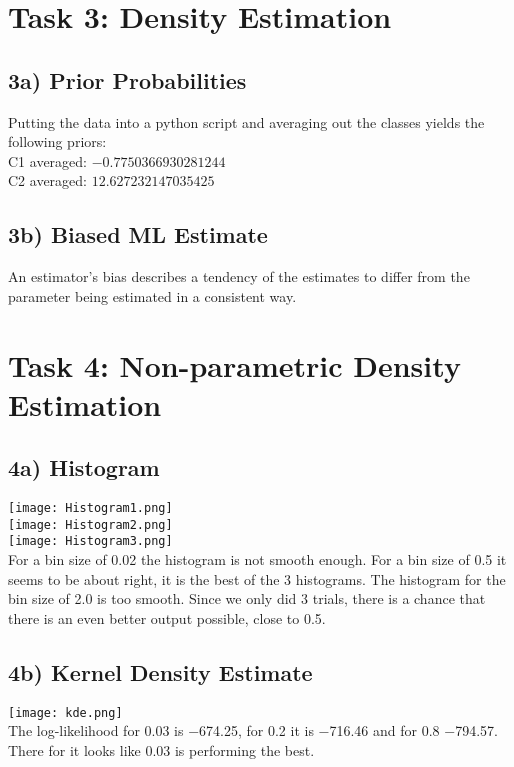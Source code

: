\documentclass{article}
\begin{document}
\section{Task 3: Density Estimation}
\subsection{3a) Prior Probabilities}
Putting the data into a python script and averaging out the classes yields the following priors: \\
C1 averaged: $-0.7750366930281244$ \\
C2 averaged: $12.627232147035425$

\subsection{3b) Biased ML Estimate}
An estimator's bias describes a tendency of the estimates to differ from the parameter being estimated in a consistent way.

\section{Task 4: Non-parametric Density Estimation}
\subsection{4a) Histogram}

\texttt{[image: Histogram1.png]}\\
\texttt{[image: Histogram2.png]}\\
\texttt{[image: Histogram3.png]}\\
For a bin size of 0.02 the histogram is not smooth enough. For a bin size of 0.5 it seems to be about right, it is the best of the 3 histograms. The histogram for the bin size of 2.0 is too smooth. Since we only did 3 trials, there is a chance that there is an even better output possible, close to 0.5.

 

\subsection{4b) Kernel Density Estimate}
\texttt{[image: kde.png]}\\
The log-likelihood for 0.03 is −674.25, for 0.2 it is −716.46 and for 0.8 −794.57. There for it looks like 0.03 is performing the best.
 
\end{document}
